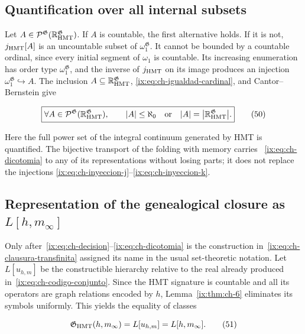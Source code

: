\subsection{Quantification over all internal subsets}

Let \(A\in\mathcal P^{\mathfrak G}
(\mathbb R_{\rm HMT}^{\mathfrak G})\). If \(A\) is countable, the first
alternative holds. If it is not, \(j_{\rm HMT}[A]\) is an uncountable subset
of \(\omega_1^{\mathfrak G}\). It cannot be bounded by a countable ordinal,
since every initial segment of \(\omega_1\) is countable. Its increasing
enumeration has order type \(\omega_1^{\mathfrak G}\), and the inverse of
\(j_{\rm HMT}\) on its image produces an injection
\(\omega_1^{\mathfrak G}\hookrightarrow A\). The inclusion
\(A\subseteq\mathbb R_{\rm HMT}^{\mathfrak G}\),
\eqref{ix:eq:ch-igualdad-cardinal}, and Cantor--Bernstein give

\[
 \boxed{
 \forall A\in\mathcal P^{\mathfrak G}
   (\mathbb R_{\rm HMT}^{\mathfrak G}),\qquad
 |A|\le\aleph_0
 \quad\text{or}\quad
 |A|=\bigl|\mathbb R_{\rm HMT}^{\mathfrak G}\bigr|.}
\tag{50}\label{ix:eq:ch-dicotomia}
\]

Here the full power set of the integral continuum generated by HMT is
quantified. The bijective transport of the folding with memory carries
~\eqref{ix:eq:ch-dicotomia} to any of its representations without losing parts;
it does not replace the injections
\eqref{ix:eq:ch-inyeccion-j}--\eqref{ix:eq:ch-inyeccion-k}.

\subsection{Representation of the genealogical closure as \texorpdfstring{\(L[h,m_\infty]\)}{L[h,m-infinity]}}

Only after~\eqref{ix:eq:ch-decision}--\eqref{ix:eq:ch-dicotomia} is the construction
in~\eqref{ix:eq:ch-clausura-transfinita} assigned its name in the usual
set-theoretic notation. Let \(L[u_{h,m}]\) be the constructible hierarchy
relative to the real already produced in~\eqref{ix:eq:ch-codigo-conjunto}. Since
the HMT signature is countable and all its operators are graph relations
encoded by \(h\), Lemma~\ref{ix:thm:ch-6} eliminates its symbols uniformly. This
yields the equality of classes

\[
 \mathfrak G_{\rm HMT}(h,m_\infty)
 =L[u_{h,m}]=L[h,m_\infty].
\tag{51}\label{ix:eq:ch-representacion-L}
\]

